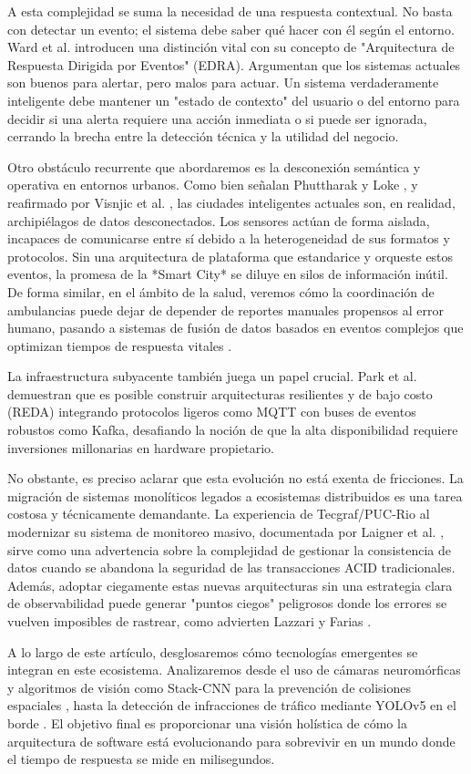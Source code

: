 A esta complejidad se suma la necesidad de una respuesta contextual. No basta con detectar un evento; el sistema debe saber qué hacer con él según el entorno. Ward et al. \cite{ward2005response} introducen una distinción vital con su concepto de "Arquitectura de Respuesta Dirigida por Eventos" (EDRA). Argumentan que los sistemas actuales son buenos para alertar, pero malos para actuar. Un sistema verdaderamente inteligente debe mantener un "estado de contexto" del usuario o del entorno para decidir si una alerta requiere una acción inmediata o si puede ser ignorada, cerrando la brecha entre la detección técnica y la utilidad del negocio.

Otro obstáculo recurrente que abordaremos es la desconexión semántica y operativa en entornos urbanos. Como bien señalan Phuttharak y Loke \cite{phuttharak2023smartcity}, y reafirmado por Visnjic et al. \cite{visnjic2021decision}, las ciudades inteligentes actuales son, en realidad, archipiélagos de datos desconectados. Los sensores actúan de forma aislada, incapaces de comunicarse entre sí debido a la heterogeneidad de sus formatos y protocolos. Sin una arquitectura de plataforma que estandarice y orqueste estos eventos, la promesa de la *Smart City* se diluye en silos de información inútil. De forma similar, en el ámbito de la salud, veremos cómo la coordinación de ambulancias puede dejar de depender de reportes manuales propensos al error humano, pasando a sistemas de fusión de datos basados en eventos complejos que optimizan tiempos de respuesta vitales \cite{bruns2014fusion}.

La infraestructura subyacente también juega un papel crucial. Park et al. \cite{park2021cloud} demuestran que es posible construir arquitecturas resilientes y de bajo costo (REDA) integrando protocolos ligeros como MQTT con buses de eventos robustos como Kafka, desafiando la noción de que la alta disponibilidad requiere inversiones millonarias en hardware propietario.

No obstante, es preciso aclarar que esta evolución no está exenta de fricciones. La migración de sistemas monolíticos legados a ecosistemas distribuidos es una tarea costosa y técnicamente demandante. La experiencia de Tecgraf/PUC-Rio al modernizar su sistema de monitoreo masivo, documentada por Laigner et al. \cite{laigner2020monolithic}, sirve como una advertencia sobre la complejidad de gestionar la consistencia de datos cuando se abandona la seguridad de las transacciones ACID tradicionales. Además, adoptar ciegamente estas nuevas arquitecturas sin una estrategia clara de observabilidad puede generar "puntos ciegos" peligrosos donde los errores se vuelven imposibles de rastrear, como advierten Lazzari y Farias \cite{lazzari2023hidden}.

A lo largo de este artículo, desglosaremos cómo tecnologías emergentes se integran en este ecosistema. Analizaremos desde el uso de cámaras neuromórficas y algoritmos de visión como Stack-CNN para la prevención de colisiones espaciales \cite{coretti2025neuromorphic}, hasta la detección de infracciones de tráfico mediante YOLOv5 en el borde \cite{perera2024traffic}. El objetivo final es proporcionar una visión holística de cómo la arquitectura de software está evolucionando para sobrevivir en un mundo donde el tiempo de respuesta se mide en milisegundos.